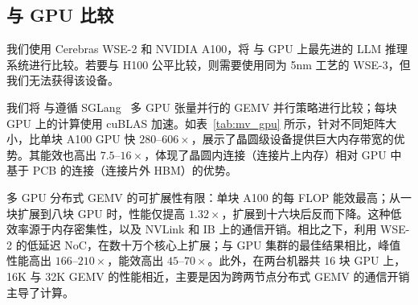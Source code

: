 \vspace{-0.2cm}
\subsection{与 GPU 比较}\label{sec:eval:gpu}
\vspace{-0.2cm}

\begin{table}[t]
  \centering
  \caption{比较 \gemv（WSE-2）与 SGLang（A100）张量并行的 GEMV 延迟和能耗。}
  \vspace{-0.3cm}
  \label{tab:mv_gpu}
\end{table}

我们使用 Cerebras WSE-2 和 NVIDIA A100，将 \sys 与 GPU 上最先进的 LLM 推理系统进行比较。若要与 H100 公平比较，则需要使用同为 5nm 工艺的 WSE-3，但我们无法获得该设备。

 我们将 \gemv 与遵循 SGLang~\cite{sglang} 多 GPU 张量并行的 GEMV 并行策略进行比较；每块 GPU 上的计算使用 cuBLAS 加速。如表~\ref{tab:mv_gpu} 所示，针对不同矩阵大小，\gemv 比单块 A100 GPU 快 $280$--$606\times$，展示了晶圆级设备提供巨大内存带宽的优势。其能效也高出 $7.5$--$16\times$，体现了晶圆内连接（连接片上内存）相对 GPU 中基于 PCB 的连接（连接片外 HBM）的优势。

多 GPU 分布式 GEMV 的可扩展性有限：单块 A100 的每 FLOP 能效最高；从一块扩展到八块 GPU 时，性能仅提高 $1.32\times$，扩展到十六块后反而下降。这种低效率源于内存密集性，以及 NVLink 和 IB 上的通信开销。相比之下，\gemv 利用 WSE-2 的低延迟 NoC，在数十万个核心上扩展；与 GPU 集群的最佳结果相比，峰值性能高出 $166$--$210\times$，能效高出 $45$--$70\times$。此外，在两台机器共 16 块 GPU 上，16K 与 32K GEMV 的性能相近，主要是因为跨两节点分布式 GEMV 的通信开销主导了计算。

